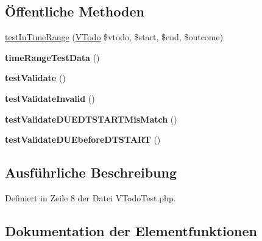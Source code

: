 \subsection*{Öffentliche Methoden}
\begin{DoxyCompactItemize}
\item 
\mbox{\hyperlink{class_sabre_1_1_v_object_1_1_component_1_1_v_todo_test_aa82771fb42f47eff56c2cfe586a474b9}{test\+In\+Time\+Range}} (\mbox{\hyperlink{class_sabre_1_1_v_object_1_1_component_1_1_v_todo}{V\+Todo}} \$vtodo, \$start, \$end, \$outcome)
\item 
\mbox{\label{class_sabre_1_1_v_object_1_1_component_1_1_v_todo_test_a038e70e2a133d114658a257ac7fabfc6}} 
{\bfseries time\+Range\+Test\+Data} ()
\item 
\mbox{\label{class_sabre_1_1_v_object_1_1_component_1_1_v_todo_test_a01c8cb153ab343b05988004b0864a174}} 
{\bfseries test\+Validate} ()
\item 
\mbox{\label{class_sabre_1_1_v_object_1_1_component_1_1_v_todo_test_a47769fbf41f896bbb76bf89124b417f7}} 
{\bfseries test\+Validate\+Invalid} ()
\item 
\mbox{\label{class_sabre_1_1_v_object_1_1_component_1_1_v_todo_test_afa4c1baf89055bfd930ef405cfc3b57d}} 
{\bfseries test\+Validate\+D\+U\+E\+D\+T\+S\+T\+A\+R\+T\+Mis\+Match} ()
\item 
\mbox{\label{class_sabre_1_1_v_object_1_1_component_1_1_v_todo_test_acb90e102a7bfb25ddd59156e50057a1d}} 
{\bfseries test\+Validate\+D\+U\+Ebefore\+D\+T\+S\+T\+A\+RT} ()
\end{DoxyCompactItemize}


\subsection{Ausführliche Beschreibung}


Definiert in Zeile 8 der Datei V\+Todo\+Test.\+php.



\subsection{Dokumentation der Elementfunktionen}
\mbox{\label{class_sabre_1_1_v_object_1_1_component_1_1_v_todo_test_aa82771fb42f47eff56c2cfe586a474b9}} 
